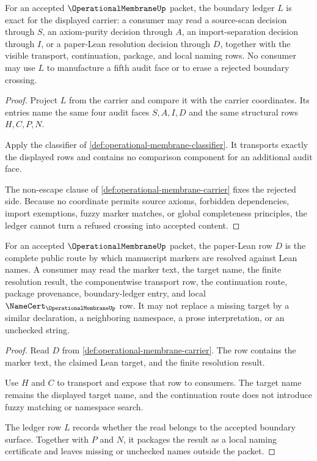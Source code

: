 \begin{theorem}
\label{thm:operational-membrane-ledger-exactness}
For an accepted $\OperationalMembraneUp$ packet, the boundary ledger $L$ is exact for the displayed carrier: a consumer may read a source-scan decision through $S$, an axiom-purity decision through $A$, an import-separation decision through $I$, or a paper-Lean resolution decision through $D$, together with the visible transport, continuation, package, and local naming rows. No consumer may use $L$ to manufacture a fifth audit face or to erase a rejected boundary crossing.
\end{theorem}
\begin{proof}
Project $L$ from the carrier and compare it with the carrier coordinates. Its entries name the same four audit faces $S,A,I,D$ and the same structural rows $H,C,P,N$.

Apply the classifier of \autoref{def:operational-membrane-classifier}. It transports exactly the displayed rows and contains no comparison component for an additional audit face.

The non-escape clause of \autoref{def:operational-membrane-carrier} fixes the rejected side. Because no coordinate permits source axioms, forbidden dependencies, import exemptions, fuzzy marker matches, or global completeness principles, the ledger cannot turn a refused crossing into accepted content.
\end{proof}

\begin{theorem}
\label{thm:operational-membrane-drift-resolution}
For an accepted $\OperationalMembraneUp$ packet, the paper-Lean row $D$ is the complete public route by which manuscript markers are resolved against Lean names. A consumer may read the marker text, the target name, the finite resolution result, the componentwise transport row, the continuation route, package provenance, boundary-ledger entry, and local $\NameCert_{\OperationalMembraneUp}$ row. It may not replace a missing target by a similar declaration, a neighboring namespace, a prose interpretation, or an unchecked string.
\end{theorem}
\begin{proof}
Read $D$ from \autoref{def:operational-membrane-carrier}. The row contains the marker text, the claimed Lean target, and the finite resolution result.

Use $H$ and $C$ to transport and expose that row to consumers. The target name remains the displayed target name, and the continuation route does not introduce fuzzy matching or namespace search.

The ledger row $L$ records whether the read belongs to the accepted boundary surface. Together with $P$ and $N$, it packages the result as a local naming certificate and leaves missing or unchecked names outside the packet.
\end{proof}

